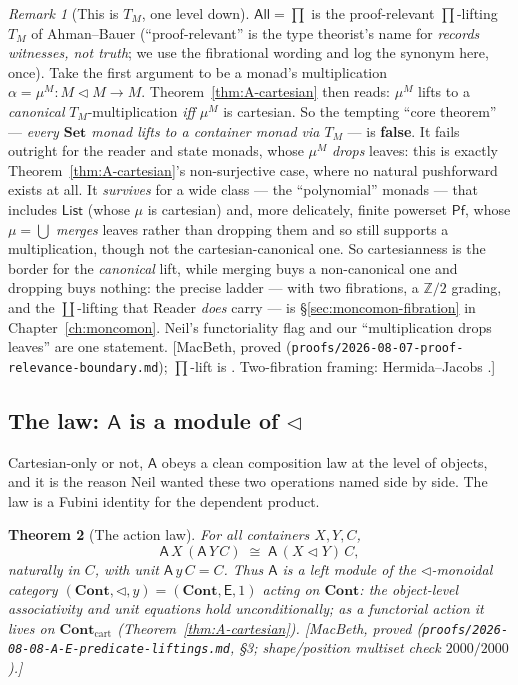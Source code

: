 \documentclass[11pt,a4paper]{book}
\newcommand{\Set}{\mathbf{Set}}
\newcommand{\Cont}{\mathbf{Cont}}
\theoremstyle{plain}
\newtheorem{Theorem}{Theorem}[chapter]
\theoremstyle{definition}
\theoremstyle{remark}
\newtheorem{Remark}[Theorem]{Remark}
\newcommand{\prov}[1]{\hfill\textsf{\footnotesize[#1]}}
\begin{document}
\begin{Remark}[This is $T_M$, one level down]\label{rem:A-is-TM}
$\mathsf{All}=\prod$ is the proof-relevant $\prod$-lifting $T_M$ of Ahman--Bauer
\cite{AhmanBauer24} (``proof-relevant'' is the type theorist's name for
\emph{records witnesses, not truth}; we use the fibrational wording and log the
synonym here, once). Take the first argument to be a monad's multiplication
$\alpha=\mu^M\colon M\triangleleft M\to M$. Theorem~\ref{thm:A-cartesian} then reads:
$\mu^M$ lifts to a \emph{canonical} $T_M$-multiplication \emph{iff} $\mu^M$ is
cartesian. So the tempting ``core theorem'' --- \emph{every $\Set$ monad lifts to a
container monad via $T_M$} --- is \textbf{false}. It fails outright for the reader
and state monads, whose $\mu^M$ \emph{drops} leaves: this is exactly
Theorem~\ref{thm:A-cartesian}'s non-surjective case, where no natural pushforward
exists at all. It \emph{survives} for a wide class --- the ``polynomial'' monads ---
that includes $\mathsf{List}$ (whose $\mu$ is cartesian) and, more delicately,
finite powerset $\mathsf{Pf}$, whose $\mu=\bigcup$ \emph{merges} leaves rather than
dropping them and so still supports a multiplication, though not the
cartesian-canonical one. So cartesianness is the border for the \emph{canonical}
lift, while merging buys a non-canonical one and dropping buys nothing: the precise
ladder --- with two fibrations, a $\mathbb Z/2$ grading, and the $\coprod$-lifting
that Reader \emph{does} carry --- is \S\ref{sec:moncomon-fibration} in
Chapter~\ref{ch:moncomon}. Neil's functoriality flag and our ``multiplication drops
leaves'' are one statement.
\prov{MacBeth, proved (\texttt{proofs/2026-08-07-proof-relevance-boundary.md});
$\prod$-lift is \cite{AhmanBauer24}. Two-fibration framing:
Hermida--Jacobs \cite{HermidaJacobs98}.}
\end{Remark}

\subsection{The law: \texorpdfstring{$\mathsf A$}{A} is a module of \texorpdfstring{$\triangleleft$}{comp}}

Cartesian-only or not, $\mathsf A$ obeys a clean composition law at the level of
objects, and it is the reason Neil wanted these two operations named side by side.
The law is a Fubini identity for the dependent product.

\begin{Theorem}[The action law]\label{thm:action-law}
For all containers $X,Y,C$,
\[
  \mathsf A\,X\,(\mathsf A\,Y\,C)\;\cong\;\mathsf A\,(X\triangleleft Y)\,C,
\]
naturally in $C$, with unit $\mathsf A\,y\,C=C$. Thus $\mathsf A$ is a
\emph{left module} of the $\triangleleft$-monoidal category $(\Cont,\triangleleft,y)=(\Cont,\mathsf E,1)$
acting on $\Cont$: the object-level associativity and unit equations hold
unconditionally; as a \emph{functorial} action it lives on $\Cont_{\mathrm{cart}}$
(Theorem~\ref{thm:A-cartesian}).
\prov{MacBeth, proved (\texttt{proofs/2026-08-08-A-E-predicate-liftings.md}, \S3;
shape/position multiset check $2000/2000$).}
\end{Theorem}
\end{document}
